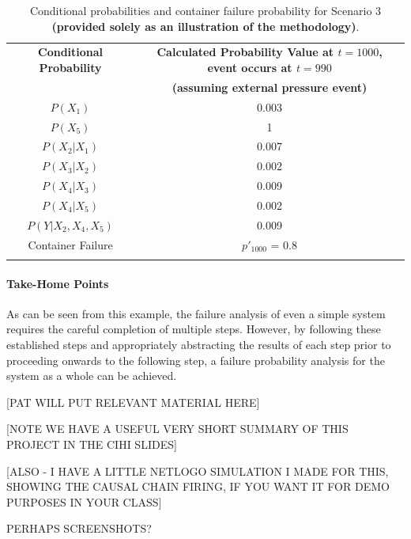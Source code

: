 \begin{table}[thbp]
\begin{center}
    \begin{tabular}{cc} \Xhline{2\arrayrulewidth}
     \textbf{Conditional Probability}          & \textbf{Calculated Probability Value at $t= 1000$, event occurs at $t= 990$ } \\ 
     & \textbf{(assuming external pressure event)} \\\Xhline{2\arrayrulewidth}
    $P(X_1)$                            & 0.003                                     \\
    $P(X_5)$                            & 1                                   \\
    $P(X_2|X_1)$                         & 0.007                                   \\
    $P(X_3|X_2)$                         & 0.002                                   \\
    $P(X_4|X_3)$                         & 0.009                                   \\
    $P(X_4|X_5)$                         & 0.002                                   \\
    $P(Y|X_2,X_4,X_5)$                    & 0.009                                   \\ \hline
    Container Failure & $p'_{1000}$ = 0.8                                  \\\Xhline{2\arrayrulewidth}
    \end{tabular}
    \small\caption{Conditional probabilities and container failure probability for Scenario 3 \textbf{(provided solely as an illustration of the methodology)}.}\normalsize
    \label{table:pressure_event_probs}
    \end{center}
\end{table}
\paragraph{Take-Home Points}

As can be seen from this example, the failure analysis of even a simple system requires the careful completion of multiple steps. However, by following these established steps and appropriately abstracting the results of each step prior to proceeding onwards to the following step, a failure probability analysis for the system as a whole can be achieved.

[PAT WILL PUT RELEVANT MATERIAL HERE]

[NOTE WE HAVE A USEFUL VERY SHORT SUMMARY OF THIS PROJECT IN THE CIHI SLIDES]

[ALSO - I HAVE A LITTLE NETLOGO SIMULATION I MADE FOR THIS, SHOWING THE CAUSAL CHAIN FIRING, IF YOU WANT IT FOR DEMO PURPOSES IN YOUR CLASS]

PERHAPS SCREENSHOTS?